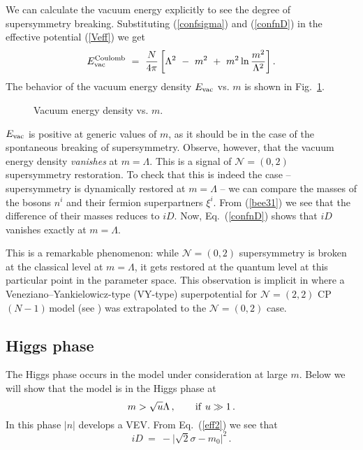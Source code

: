 \documentclass[epsfig,12pt]{article}
\def\beq{\begin{equation}}
\def\eeq{\end{equation}}
\newcommand{\cpn}{CP$(N-1)\,$}
\def\beq{\begin{equation}}
\def\eeq{\end{equation}}
\newcommand{\ntwot}{${\mathcal N}= \left(2,2\right) $ }
\newcommand{\ntwoo}{${\mathcal N}= \left(0,2\right) $ }
\begin{document}
{We can calculate the vacuum energy  explicitly to see  the degree of supersymmetry breaking.
Substituting (\ref{confsigma}) and (\ref{confnD}) in the effective potential (\ref{Veff})
we get
\beq
E_{\rm vac}^{\rm Coulomb}~=~\frac{N}{4\pi}\left[ \Lambda^2~-~m^2~+~m^2\ln {\frac{m^2}{\Lambda^2}}\right].
\label{confEvac}
\eeq
The behavior of the vacuum energy density $E_{\rm vac}$ vs. $m$ is shown  in Fig.~\ref{figvacE}.

\begin{figure}
\epsfxsize=10cm
\centerline{}
\caption{\small Vacuum energy density vs. $m$.}
\label{figvacE}
\end{figure}

$E_{\rm vac}$ is positive  at generic values of $m$, as it should be in the
 case of the spontaneous breaking of supersymmetry.
Observe, however, that the vacuum energy density {\em vanishes}
at $m=\Lambda$. This is a signal of \ntwoo supersymmetry restoration. To check that this
is indeed the case -- supersymmetry is dynamically restored at  $m=\Lambda$ -- we can
compare the masses of the bosons $n^i$ and their fermion superpartners $\xi^i$. 
From (\ref{bee31}) we see that the difference of 
their masses reduces to $iD$. Now, Eq.~(\ref{confnD}) shows that $iD$ vanishes exactly at $m=\Lambda$.

This is a remarkable phenomenon: while \ntwoo supersymmetry is broken at the classical level
at $m=\Lambda$, 
it gets restored at the quantum level at this particular point in the parameter space. 
This  observation is implicit
 in \cite{Tonghetdyn} where a Veneziano--Yankielowicz-type (VY-type)
 superpotential  \cite{VYan} for  \ntwot \cpn model (see \cite{AdDVecSal,ChVa,W93}) was
 extrapolated to     the \ntwoo  case.

\subsection{ Higgs phase}
\label{subshiggph}

The Higgs phase occurs in the model 
under consideration at large $m$. Below we will show that the model is in the Higgs phase at
\beq
m>\sqrt{u}\Lambda\,,\qquad {\rm if} \,\,u\gg 1\,.
\label{Hphmass}
\eeq
In this phase $|n|$ develops a VEV. From Eq.~(\ref{eff2}) we see that
\beq
iD ~=~ -\bigl|\sqrt{2}\sigma -m_0\bigr|^2\, .
\label{HphD}
\eeq

}
\end{document}
